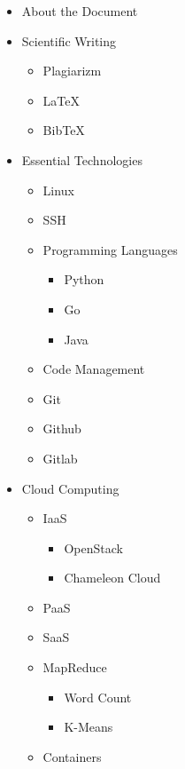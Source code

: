 \begin{itemize}
\item About the Document
\item Scientific Writing

  \begin{itemize}

  \item   Plagiarizm
  \item   LaTeX
  \item   BibTeX
  \end{itemize}
\item Essential Technologies

  \begin{itemize}
  \item   Linux
  \item   SSH
  \item   Programming Languages

    \begin{itemize}

    \item     Python
    \item     Go
    \item     Java
    \end{itemize}
  \item   Code Management
  \item   Git
  \item   Github
  \item   Gitlab
  \end{itemize}
\item Cloud Computing

  \begin{itemize}
  \item   IaaS

    \begin{itemize}
    \item     OpenStack
    \item     Chameleon Cloud
    \end{itemize}
  \item   PaaS
  \item   SaaS
  \item   MapReduce

    \begin{itemize}

    \item     Word Count
    \item     K-Means
    \end{itemize}
  \item   Containers


\end{itemize}
\end{itemize}
